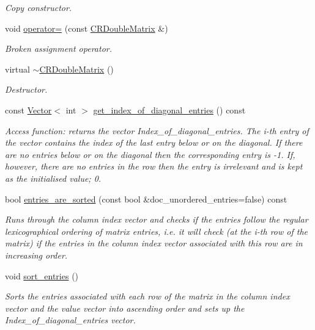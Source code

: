 \begin{DoxyCompactItemize}
\begin{DoxyCompactList}\small\item\em Copy constructor. \end{DoxyCompactList}\item 
void \hyperlink{classoomph_1_1CRDoubleMatrix_aab7e1485ecaaebc2846da2882cb96f2f}{operator=} (const \hyperlink{classoomph_1_1CRDoubleMatrix}{C\+R\+Double\+Matrix} \&)
\begin{DoxyCompactList}\small\item\em Broken assignment operator. \end{DoxyCompactList}\item 
virtual \hyperlink{classoomph_1_1CRDoubleMatrix_a27c30b4faf3d2328f3b9ce9c590f43a4}{$\sim$\+C\+R\+Double\+Matrix} ()
\begin{DoxyCompactList}\small\item\em Destructor. \end{DoxyCompactList}\item 
const \hyperlink{classoomph_1_1Vector}{Vector}$<$ int $>$ \hyperlink{classoomph_1_1CRDoubleMatrix_a80c3342b36dbcdf60bb21676fda66c97}{get\+\_\+index\+\_\+of\+\_\+diagonal\+\_\+entries} () const
\begin{DoxyCompactList}\small\item\em Access function\+: returns the vector Index\+\_\+of\+\_\+diagonal\+\_\+entries. The i-\/th entry of the vector contains the index of the last entry below or on the diagonal. If there are no entries below or on the diagonal then the corresponding entry is -\/1. If, however, there are no entries in the row then the entry is irrelevant and is kept as the initialised value; 0. \end{DoxyCompactList}\item 
bool \hyperlink{classoomph_1_1CRDoubleMatrix_ae35fbae1702bbf75601c2a1026df103e}{entries\+\_\+are\+\_\+sorted} (const bool \&doc\+\_\+unordered\+\_\+entries=false) const
\begin{DoxyCompactList}\small\item\em Runs through the column index vector and checks if the entries follow the regular lexicographical ordering of matrix entries, i.\+e. it will check (at the i-\/th row of the matrix) if the entries in the column index vector associated with this row are in increasing order. \end{DoxyCompactList}\item 
void \hyperlink{classoomph_1_1CRDoubleMatrix_a2107875787d4dfa1cf007c05a041b078}{sort\+\_\+entries} ()
\begin{DoxyCompactList}\small\item\em Sorts the entries associated with each row of the matrix in the column index vector and the value vector into ascending order and sets up the Index\+\_\+of\+\_\+diagonal\+\_\+entries vector. \end{DoxyCompactList}\item 

\end{DoxyCompactItemize}
